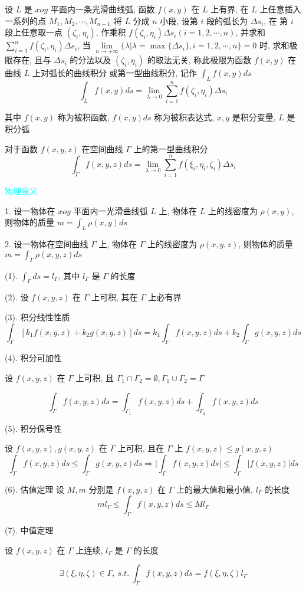 \begin{definition}[第一型曲线积分]
	设 $L$ 是 $xoy$ 平面内一条光滑曲线弧, 函数 $f(x,y)$ 在 $L$ 上有界, 在 $L$ 上任意插入一系列的点 $M_{1}, M_{2}, \cdots, M_{n-1}$ 将 $L$ 分成 $n$ 小段, 设第 $i$ 段的弧长为 $\Delta s_{i}$, 
	在 第 $i$ 段上任意取一点 $(\zeta_{i},\eta_{i})$, 作乘积 $f(\zeta_{i},\eta_{i})\Delta s_{i}(i=1,2,\cdots,n)$, 并求和 $\sum\limits_{i=1}^{n}f(\zeta_{i},\eta_{i})\Delta s_{i}$, 当 
	$\lim\limits_{n \to +\infty}\{\lambda|\lambda = \max\{\Delta s_{i}\}, i =1,2,\cdots,n\} = 0$ 时, 求和极限存在, 
	且与 $\Delta s_{i}$ 的分法以及 $(\zeta_{i},\eta_{i})$ 的取法无关, 称此极限为函数 $f(x,y)$ 在曲线 $L$ 上对弧长的曲线积分
	或第一型曲线积分, 记作 $\int_{L}f(x,y)ds$
	$$\int_{L}f(x,y)ds = \lim\limits_{\lambda \to 0}\sum\limits_{i=1}^{n}f(\zeta_{i},\eta_{i})\Delta s_{i}$$ 

	其中 $f(x,y)$ 称为被积函数, $f(x,y)ds$ 称为被积表达式, $x,y$ 是积分变量, $L$ 是积分弧

	对于函数 $f(x,y,z)$ 在空间曲线 $\Gamma$ 上的第一型曲线积分
	$$\int_{\Gamma}f(x,y,z)ds = \lim\limits_{\lambda \to 0}\sum\limits_{i=1}^{n}f(\xi_{i},\eta_{i},\zeta_{i})\Delta s_{i}$$

	\textcolor{cyan}{物理意义}

	1. 设一物体在 $xoy$ 平面内一光滑曲线弧 $L$ 上, 物体在 $L$ 上的线密度为 $\rho(x,y)$, 则物体的质量 $m = \int_{L}\rho(x,y)ds$

	2. 设一物体在空间曲线 $\Gamma$ 上, 物体在 $\Gamma$ 上的线密度为 $\rho(x,y,z)$, 则物体的质量 $m = \int_{\Gamma}\rho(x,y,z)ds$
\end{definition}
\begin{corollary}

	(1). $\displaystyle{\int_{\Gamma} ds = l_{\Gamma}}$, 其中 $l_{\Gamma}$ 是 $\Gamma$ 的长度

	(2). 设 $f(x,y,z)$ 在 $\Gamma$ 上可积, 其在 $\Gamma$ 上必有界

	(3). 积分线性性质
	$$\int_{\Gamma}\left[k_{1}f(x,y,z) + k_{2} g(x,y,z)\right]ds = k_{1}\int_{\Gamma}f(x,y,z)ds+k_{2}\int_{\Gamma}g(x,y,z)ds$$

	(4). 积分可加性

	设 $f(x,y,z)$ 在 $\Gamma$ 上可积, 且 $\Gamma_{1}\cap \Gamma_{2}=\emptyset, \Gamma_{1}\cup \Gamma_{2}=\Gamma$

	$$\int_{\Gamma}f(x,y,z)ds = \int_{\Gamma_{1}}f(x,y,z)ds + \int_{\Gamma_{2}}f(x,y,z)ds$$

	(5). 积分保号性

	设 $f(x,y,z), g(x,y,z)$ 在 $\Gamma$ 上可积, 且在 $\Gamma$ 上 $f(x,y,z) \leq g(x,y,z)$
	$$\int_{\Gamma}f(x,y,z)ds \leq \int_{\Gamma}g(x,y,z)ds\Rightarrow \big|\int_{\Gamma}f(x,y,z)ds\big| \leq \int_{\Gamma}\big|f(x,y,z)\big|ds$$

	(6). 估值定理
	设 $M,m$ 分别是 $f(x,y,z)$ 在 $\Gamma$ 上的最大值和最小值, $l_{\Gamma}$ 的长度
	$$ml_{\Gamma} \leq \int_{\Gamma}f(x,y,z)ds \leq Ml_{\Gamma}$$

	(7). 中值定理

	设 $f(x,y,z)$ 在 $\Gamma$ 上连续, $l_{\Gamma}$ 是 $\Gamma$ 的长度

	$$\exists (\xi,\eta,\zeta)\in \Gamma,\ s.t.\ \int_{\Gamma}f(x,y,z) ds = f(\xi,\eta,\zeta)l_{\Gamma}$$
\end{corollary}

